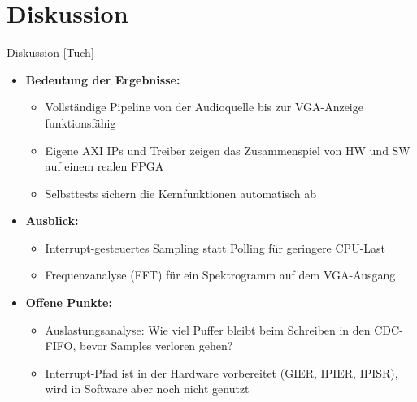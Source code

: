 \section{Diskussion}
\begin{frame}{Diskussion [Tuch]}
    \begin{itemize}
        \item \textbf{Bedeutung der Ergebnisse:}
        \begin{itemize}
            \item Vollständige Pipeline von der Audioquelle bis zur VGA-Anzeige funktionsfähig
            \item Eigene AXI IPs und Treiber zeigen das Zusammenspiel von HW und SW auf einem realen FPGA
            \item Selbsttests sichern die Kernfunktionen automatisch ab
        \end{itemize}
        \item \textbf{Ausblick:}
        \begin{itemize}
            \item Interrupt-gesteuertes Sampling statt Polling für geringere CPU-Last
            \item Frequenzanalyse (FFT) für ein Spektrogramm auf dem VGA-Ausgang
        \end{itemize}
        \item \textbf{Offene Punkte:}
        \begin{itemize}
            \item Auslastungsanalyse: Wie viel Puffer bleibt beim Schreiben in den CDC-FIFO, bevor Samples verloren gehen?
            \item Interrupt-Pfad ist in der Hardware vorbereitet (GIER, IPIER, IPISR), wird in Software aber noch nicht genutzt
        \end{itemize}
    \end{itemize}
\end{frame}
